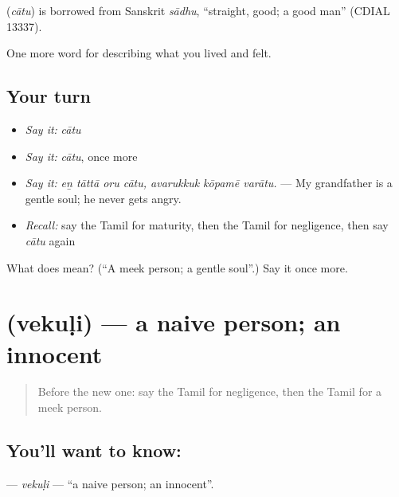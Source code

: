 \begin{cousinweb}
\textbf{} (\emph{cātu}) is borrowed from Sanskrit \emph{sādhu}, \textquotedblleft{}straight, good; a good man\textquotedblright{} (CDIAL 13337).
\end{cousinweb}

\begin{grammarlens}[title={What you've built}]
One more word for describing what you lived and felt.
\end{grammarlens}

\subsection*{Your turn}
\begin{itemize}
\raggedright
  \item \emph{Say it:} \emph{cātu}
  \item \emph{Say it:} \emph{cātu}, once more
  \item \emph{Say it:} \emph{eṉ tāttā oru cātu, avarukkuk kōpamē varātu.} — My grandfather is a gentle soul; he never gets angry.
  \item \emph{Recall:} say the Tamil for maturity, then the Tamil for negligence, then say \emph{cātu} again
\end{itemize}

\begin{tcolorbox}[breakable,colback=teal!4,colframe=teal!35!black,title={Before you move on}]
What does  mean? (\textquotedblleft{}A meek person; a gentle soul\textquotedblright{}.) Say it once more.
\end{tcolorbox}
\section[\texorpdfstring{\ta{வெகுளி} (vekuḷi)}{வெகுளி (vekuḷi)}]{ (vekuḷi) — a naive person; an innocent}

\label{lesson:TA-C472-vekuli}



\begin{quote}
Before the new one: say the Tamil for negligence, then the Tamil for a meek person.
\end{quote}

\subsection*{You'll want to know: }
\textbf{} — \emph{vekuḷi} — \textquotedblleft{}a naive person; an innocent\textquotedblright{}.

